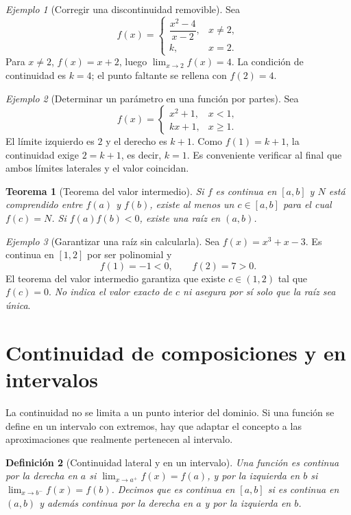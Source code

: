 \documentclass[12pt]{article}
\newtheorem{definicion}{Definición}[section]
\newtheorem{teorema}[definicion]{Teorema}
\theoremstyle{remark}
\newtheorem{ejemplo}{Ejemplo}
\begin{document}
\begin{ejemplo}[Corregir una discontinuidad removible]
Sea
\[
 f(x)=\begin{cases}\dfrac{x^2-4}{x-2},&x\ne2,\\k,&x=2.\end{cases}
\]
Para $x\ne2$, $f(x)=x+2$, luego $\lim_{x\to2}f(x)=4$. La condición de continuidad es $k=4$; el punto faltante se rellena con $\boxed{f(2)=4}$.
\end{ejemplo}

\begin{ejemplo}[Determinar un parámetro en una función por partes]
Sea
\[
 f(x)=\begin{cases}x^2+1,&x<1,\\kx+1,&x\ge1.\end{cases}
\]
El límite izquierdo es $2$ y el derecho es $k+1$. Como $f(1)=k+1$, la continuidad exige $2=k+1$, es decir, $\boxed{k=1}$. Es conveniente verificar al final que ambos límites laterales y el valor coincidan.
\end{ejemplo}

\begin{teorema}[Teorema del valor intermedio]
Si $f$ es continua en $[a,b]$ y $N$ está comprendido entre $f(a)$ y $f(b)$, existe al menos un $c\in[a,b]$ para el cual $f(c)=N$. Si $f(a)f(b)<0$, existe una raíz en $(a,b)$.
\end{teorema}

\begin{ejemplo}[Garantizar una raíz sin calcularla]
Sea $f(x)=x^3+x-3$. Es continua en $[1,2]$ por ser polinomial y
\[
 f(1)=-1<0,\qquad f(2)=7>0.
\]
El teorema del valor intermedio garantiza que existe $c\in(1,2)$ tal que $f(c)=0$. \emph{No indica el valor exacto de $c$ ni asegura por sí solo que la raíz sea única}.
\end{ejemplo}

\section{Continuidad de composiciones y en intervalos}
La continuidad no se limita a un punto interior del dominio. Si una función se define en un intervalo con extremos, hay que adaptar el concepto a las aproximaciones que realmente pertenecen al intervalo.

\begin{definicion}[Continuidad lateral y en un intervalo]
Una función es continua por la derecha en $a$ si $\lim_{x\to a^+}f(x)=f(a)$, y por la izquierda en $b$ si $\lim_{x\to b^-}f(x)=f(b)$. Decimos que es continua en $[a,b]$ si es continua en $(a,b)$ y además continua por la derecha en $a$ y por la izquierda en $b$.
\end{definicion}
\end{document}
